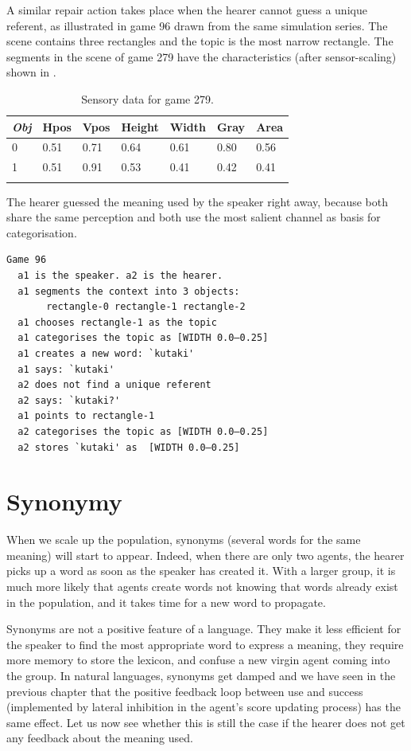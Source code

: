 A similar repair action takes place when the hearer
cannot guess a unique referent, as illustrated in
game 96 drawn from the same simulation series. 
The scene contains three rectangles and the 
topic is the most narrow rectangle. The segments in the scene of game 279
have the characteristics (after sensor-scaling) shown in . 


\begin{table}
\begin{center}
\begin{tabular}{ l  l  l  l  l  l  l }
\lsptoprule
{\itshape Obj}&Hpos&Vpos&Height&Width&Gray&Area \\ \midrule
0 &0.51 & 0.71 & 0.64 & 0.61 & 0.80 & 0.56\\ 
1 & 0.51 & 0.91 & 0.53 & 0.41 & 0.42 & 0.41 \\ 
\lspbottomrule
\end{tabular}
\caption{\label{tab:279}Sensory data for game 279.}
\end{center}
\end{table}
The hearer guessed the meaning used
by the speaker right away, because both 
share the same perception and both use the most 
salient channel as basis for categorisation. 
\begin{verbatim}
Game 96
  a1 is the speaker. a2 is the hearer. 
  a1 segments the context into 3 objects: 
       rectangle-0 rectangle-1 rectangle-2
  a1 chooses rectangle-1 as the topic 
  a1 categorises the topic as [WIDTH 0.0–0.25]
  a1 creates a new word: `kutaki'
  a1 says: `kutaki'
  a2 does not find a unique referent
  a2 says: `kutaki?'
  a1 points to rectangle-1
  a2 categorises the topic as [WIDTH 0.0–0.25]
  a2 stores `kutaki' as  [WIDTH 0.0–0.25]
\end{verbatim}

\section{Synonymy}

When we scale up the population, synonyms (several words
for the same meaning) will start to appear. Indeed,
when there are only two agents, the hearer picks 
up a word as soon as the speaker has created it. With a larger
group, it is much more likely that agents create words
not knowing that words already exist in the population, and 
it takes time for a new word to propagate. 

Synonyms are not a positive feature of a language. They make 
it less efficient for the speaker to find the most 
appropriate word to express a meaning, they require more
memory to store the lexicon, and confuse a new virgin 
agent coming into the group. In natural languages, synonyms get
damped and we have seen in the previous chapter
that the positive feedback loop between 
use and success (implemented by lateral inhibition
in the agent's score updating process) has the same
effect. Let us now see whether this is still the 
case if the hearer does not get any feedback about the
meaning used. 

